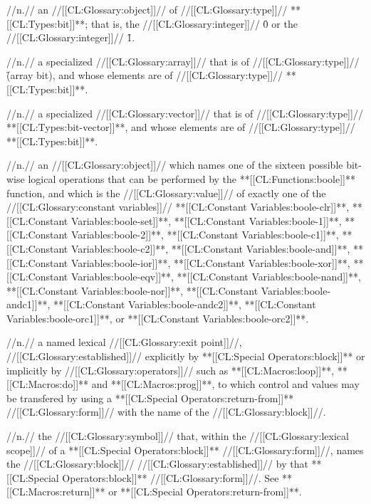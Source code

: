  //n.// an //[[CL:Glossary:object]]// of //[[CL:Glossary:type]]// **[[CL:Types:bit]]**; that is, the //[[CL:Glossary:integer]]// \f{0} or the //[[CL:Glossary:integer]]// \f{1}.

 //n.// a specialized //[[CL:Glossary:array]]// that is of //[[CL:Glossary:type]]// \f{(array bit)}, and whose elements are of //[[CL:Glossary:type]]// **[[CL:Types:bit]]**.

 //n.// a specialized //[[CL:Glossary:vector]]// that is of //[[CL:Glossary:type]]// **[[CL:Types:bit-vector]]**, and whose elements are of //[[CL:Glossary:type]]// **[[CL:Types:bit]]**.

 //n.// an //[[CL:Glossary:object]]// which names one of the sixteen possible bit-wise logical operations that can be performed by the **[[CL:Functions:boole]]** function, and which is the //[[CL:Glossary:value]]// of exactly one of the //[[CL:Glossary:constant variables]]// **[[CL:Constant Variables:boole-clr]]**, **[[CL:Constant Variables:boole-set]]**, **[[CL:Constant Variables:boole-1]]**, **[[CL:Constant Variables:boole-2]]**, **[[CL:Constant Variables:boole-c1]]**, **[[CL:Constant Variables:boole-c2]]**, **[[CL:Constant Variables:boole-and]]**, **[[CL:Constant Variables:boole-ior]]**, **[[CL:Constant Variables:boole-xor]]**, **[[CL:Constant Variables:boole-eqv]]**, **[[CL:Constant Variables:boole-nand]]**, **[[CL:Constant Variables:boole-nor]]**, **[[CL:Constant Variables:boole-andc1]]**, **[[CL:Constant Variables:boole-andc2]]**, **[[CL:Constant Variables:boole-orc1]]**, or **[[CL:Constant Variables:boole-orc2]]**.

 //n.// a named lexical //[[CL:Glossary:exit point]]//, //[[CL:Glossary:established]]// explicitly by **[[CL:Special Operators:block]]** or implicitly by //[[CL:Glossary:operators]]// such as **[[CL:Macros:loop]]**, **[[CL:Macros:do]]** and **[[CL:Macros:prog]]**, to which control and values may be transfered by using a **[[CL:Special Operators:return-from]]** //[[CL:Glossary:form]]// with the name of the //[[CL:Glossary:block]]//.

 //n.// the //[[CL:Glossary:symbol]]// that, within the //[[CL:Glossary:lexical scope]]// of a **[[CL:Special Operators:block]]** //[[CL:Glossary:form]]//, names the //[[CL:Glossary:block]]// //[[CL:Glossary:established]]// by that **[[CL:Special Operators:block]]** //[[CL:Glossary:form]]//. See **[[CL:Macros:return]]** or **[[CL:Special Operators:return-from]]**.

